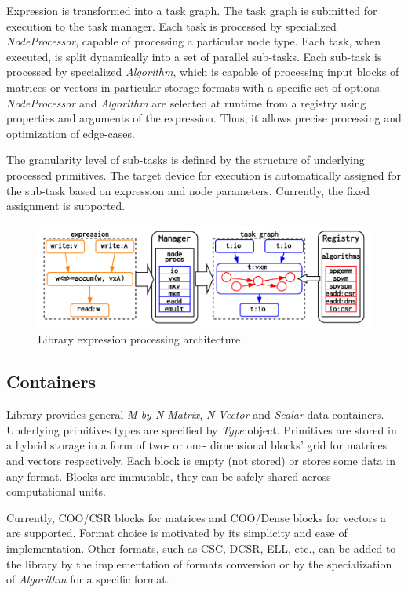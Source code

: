 Expression is transformed into a task graph. 
The task graph is submitted for execution to the task manager. 
Each task is processed by specialized \textit{NodeProcessor}, capable of processing a particular node type.
Each task, when executed, is split dynamically into a set of parallel sub-tasks. 
Each sub-task is processed by specialized \textit{Algorithm}, which is capable of processing input blocks of matrices or vectors in particular storage formats with a specific set of options. \textit{NodeProcessor} and \textit{Algorithm} are selected at runtime from a registry using properties and arguments of the expression. 
Thus, it allows precise processing and optimization of edge-cases.

The granularity level of sub-tasks is defined by the structure of underlying processed primitives. 
The target device for execution is automatically assigned for the sub-task based on expression and node parameters. 
Currently, the fixed assignment is supported.

\begin{figure}[t]
\centering
\includegraphics[width=0.95\linewidth]{architecture.png}
\caption{Library expression processing architecture.}
\label{fig:architecture}
\end{figure}
    
\subsection{Containers}

Library provides general \textit{M-by-N Matrix}, \textit{N Vector} and \textit{Scalar} data containers.
Underlying primitives types are specified by \textit{Type} object. 
Primitives are stored in a hybrid storage in a form of two- or one- dimensional blocks' grid for matrices and vectors respectively. 
Each block is empty (not stored) or stores some data in any format. Blocks are immutable, they can be safely shared across computational units.

Currently, COO/CSR blocks for matrices and COO/Dense blocks for vectors a are supported. Format choice is motivated by its simplicity and ease of implementation. 
Other formats, such as CSC, DCSR, ELL, etc., can be added to the library by the implementation of formats conversion or by the specialization of \textit{Algorithm} for a specific format.

